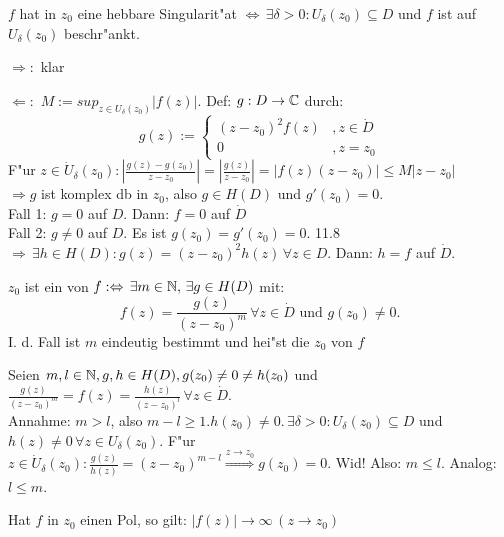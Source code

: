 \documentclass[a4paper,twoside,DIV15,BCOR12mm]{scrbook}
\begin{document}
\begin{satz}
$f$ hat in $z_0$ eine hebbare Singularit"at $\Leftrightarrow \, \exists \delta > 0: U_{\delta}(z_0) \subseteq D$ und $f$ ist auf $U_{\delta}(z_0)$ beschr"ankt.
\end{satz}

\begin{beweis}
\item[$\Rightarrow:$] klar
\item[$\Leftarrow:$] $M:=sup_{z \in U_{\delta}(z_0)} |f(z)|$. Def: $g: D \rightarrow \mathbb{C}$ durch:
\[
g(z) := \begin{cases} (z-z_0)^2f(z) &, z \in \dot{D} \\
0 &, z=z_0 \end{cases}
\]
F"ur $z \in \dot{U}_{\delta}(z_0): \left| \frac{g(z)-g(z_0)}{z-z_0} \right| = \left| \frac{g(z)}{z-z_0} \right| = |f(z)(z-z_0)| \leq M|z-z_0|$\\
$\Rightarrow g$ ist komplex db in $z_0$, also $g \in H(D)$ und $g'(z_0) = 0$.\\
Fall 1: $g = 0$ auf $D$. Dann: $f=0$ auf $\dot{D}$\\
Fall 2: $g \not= 0$ auf $D$. Es ist $g(z_0) = g'(z_0) = 0.$ 11.8 $\Rightarrow \, \exists h \in H(D): g(z) = (z-z_0)^2 h(z) \, \forall z \in D.$ Dann: $h=f$ auf $\dot{D}$.
\end{beweis}

\begin{satz}
$z_0$ ist ein  von $f : \Leftrightarrow \,\exists m \in \mathbb{N}, \, \exists g \in H(D)$ mit:
\[
f(z) = \frac{g(z)}{(z-z_0)^m} \, \forall z \in \dot{D} \mbox{ und } g(z_0) \not= 0.
\]
I. d. Fall ist $m$ eindeutig bestimmt und hei"st die  $z_0$ von $f$
\end{satz}

\begin{beweis}
Seien $m,l \in \mathbb{N}, g,h \in H(D), g(z_0) \not= 0 \not= h(z_0)$ und $\frac{g(z)}{(z-z_0)^m} = f(z) = \frac{h(z)}{(z-z_0)^l} \, \forall z \in \dot{D}.$\\
Annahme: $m > l$, also $m-l \geq 1. h(z_0) \not= 0. \, \exists \delta > 0: U_{\delta}(z_0) \subseteq D$ und $h(z) \not= 0 \, \forall z \in U_{\delta}(z_0).$ F"ur $z \in \dot{U}_{\delta}(z_0): \frac{g(z)}{h(z)} = (z-z_0)^{m-l} \stackrel{z \rightarrow z_0}{\Rightarrow} g(z_0) = 0$. Wid! Also: $m \leq l$. Analog: $l \leq m$.
\end{beweis}

\begin{satz}
Hat $f$ in $z_0$ einen Pol, so gilt: $|f(z)| \rightarrow \infty \, (z \rightarrow z_0)$
\end{satz}
\end{document}
